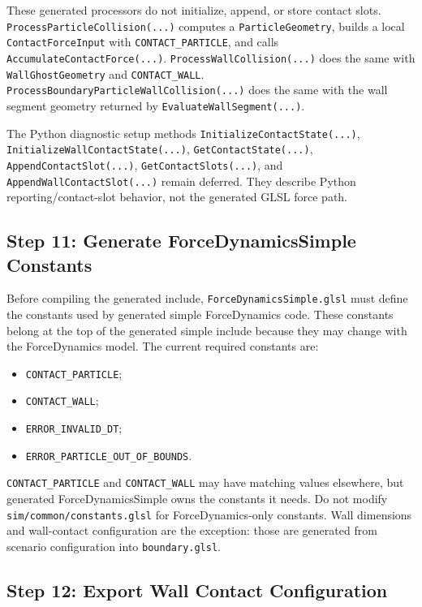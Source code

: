 These generated processors do not initialize, append, or store contact slots.
\texttt{ProcessParticleCollision(...)} computes a \texttt{ParticleGeometry},
builds a local \texttt{ContactForceInput} with
\texttt{CONTACT\_PARTICLE}, and calls \texttt{AccumulateContactForce(...)}.
\texttt{ProcessWallCollision(...)} does the same with
\texttt{WallGhostGeometry} and \texttt{CONTACT\_WALL}.
\texttt{ProcessBoundaryParticleWallCollision(...)} does the same with the wall
segment geometry returned by \texttt{EvaluateWallSegment(...)}.

The Python diagnostic setup methods \texttt{InitializeContactState(...)},
\texttt{InitializeWallContactState(...)}, \texttt{GetContactState(...)},
\texttt{AppendContactSlot(...)}, \texttt{GetContactSlots(...)}, and
\texttt{AppendWallContactSlot(...)} remain deferred.  They describe Python
reporting/contact-slot behavior, not the generated GLSL force path.

\subsection{Step 11: Generate ForceDynamicsSimple Constants}

Before compiling the generated include, \texttt{ForceDynamicsSimple.glsl}
must define the constants used by generated simple ForceDynamics code.  These
constants belong at the top of the generated simple include because they may
change with the ForceDynamics model.  The current required constants are:
\begin{itemize}
    \item \texttt{CONTACT\_PARTICLE};
    \item \texttt{CONTACT\_WALL};
    \item \texttt{ERROR\_INVALID\_DT};
    \item \texttt{ERROR\_PARTICLE\_OUT\_OF\_BOUNDS}.
\end{itemize}

\texttt{CONTACT\_PARTICLE} and \texttt{CONTACT\_WALL} may have matching
values elsewhere, but generated ForceDynamicsSimple owns the constants it
needs.  Do not modify \texttt{sim/common/constants.glsl} for
ForceDynamics-only constants.  Wall dimensions and wall-contact configuration
are the exception: those are generated from scenario configuration into
\texttt{boundary.glsl}.

\subsection{Step 12: Export Wall Contact Configuration}

